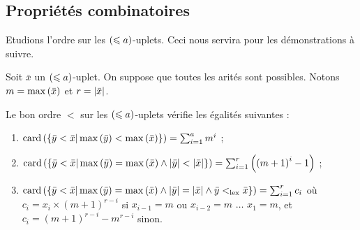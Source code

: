 		\subsection{Propriétés combinatoires}
		\label{subsec:bon_ordre_prop_combinatoires}
		
		Etudions l'ordre sur les $\left( \leqslant a \right)$-uplets. Ceci nous servira pour les démonstrations à suivre. 
		
		\begin{prop}
			\label{prop:bon_ordre_combinatoire}
			Soit $\bar{x}$ un $\left( \leqslant a \right)$-uplet. On suppose que toutes les arités sont possibles. Notons $m = \max\left( \bar{x} \right)$ et $r = \left|\bar{x}\right|$.
			
			Le bon ordre $<$ sur les $\left( \leqslant a \right)$-uplets vérifie les égalités suivantes :
			
			\begin{enumerate}
				\item 	\label{itm:bon_ordre_combinatoire1} 
						$\text{card}\left( \left\lbrace \bar{y} < \bar{x} | \max\left( \bar{y} \right) < \max\left( \bar{x} \right) \right\rbrace \right) = \sum_{i=1}^{a} m^i$ ;
						
				\item 	\label{itm:bon_ordre_combinatoire2} 
						$\text{card}\left( \left\lbrace \bar{y} < \bar{x} | \max\left( \bar{y} \right) = \max\left( \bar{x} \right) \wedge \left|\bar{y}\right| < \left|\bar{x}\right|  \right\rbrace \right) = \sum_{i=1}^{r} \left( \left(m+1\right)^i -1 \right)$ ; 
						
				\item 	\label{itm:bon_ordre_combinatoire3} 
						$\text{card}\left( \left\lbrace \bar{y} < \bar{x} | \max\left( \bar{y} \right) = \max\left( \bar{x} \right) \wedge \left|\bar{y}\right| = \left|\bar{x}\right| \wedge \bar{y} <_{\text{lex}} \bar{x}  \right\rbrace \right) = \sum_{i=1}^{r} c_i$ où $c_i = x_i \times \left(m+1\right)^{r-i}$ si $x_{i-1} = m$ ou $x_{i-2} = m$ $\dots$ $x_{1} = m$, et $c_i = \left(m+1\right)^{r-i}-m^{r-i}$ sinon. 
			\end{enumerate}
		\end{prop}
		
